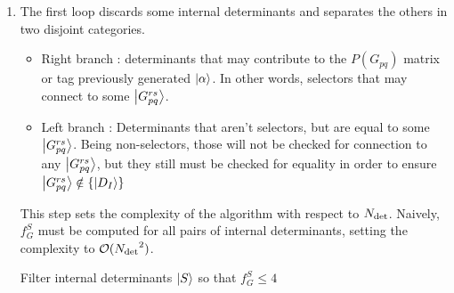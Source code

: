 \documentclass[./thesis.tex]{subfiles}
\begin{document}
\begin{enumerate}

\item
The first loop discards some internal determinants and separates the others in two disjoint categories.


\begin{itemize}
\item
Right branch : determinants that may contribute to the $P(G_{pq})$ matrix or tag previously generated $\ket \alpha$. In other words, selectors that may connect to some $\ket {G_{pq}^{rs}}$. 

\item
Left branch : Determinants that aren't selectors, but are equal to some $\ket {G_{pq}^{rs}}$. Being non-selectors, those will not be checked for connection to any $\ket {G_{pq}^{rs}}$, but they still must be checked for equality in order to ensure $\ket {G_{pq}^{rs}} \notin \left \{ {\ket{D_I}} \right \}$
\end{itemize}


This step sets the complexity of the algorithm with respect to ${N_\text{det}}$. Naively, $f_G^S$ must be computed for all pairs of internal determinants, setting the complexity to $\mathcal{O}({N_\text{det}}^2)$.

\begin{algorithm}
\caption{Filter internal determinants $\ket S$ so that $f_G^S \leq 4$ }
\label{alg:generators_filtering}


\end{algorithm}
\end{enumerate}
\end{document}
